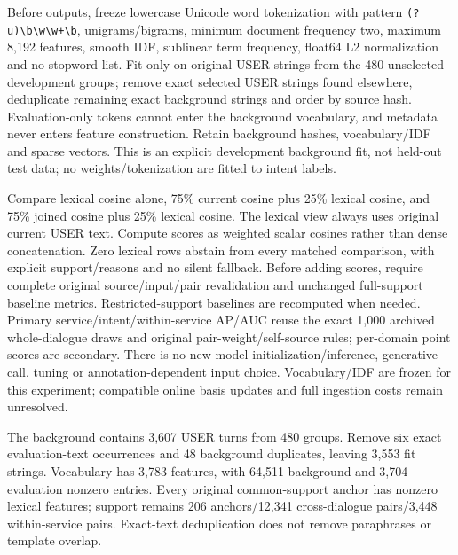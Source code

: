\documentclass[11pt]{article}
\begin{document}
Before outputs, freeze lowercase Unicode word tokenization with pattern
\verb|(?u)\b\w\w+\b|, unigrams/bigrams, minimum document frequency two,
maximum 8,192 features, smooth IDF, sublinear term frequency, float64 L2
normalization and no stopword list. Fit only on original USER strings from the
480 unselected development groups; remove exact selected USER strings found
elsewhere, deduplicate remaining exact background strings and order by source
hash. Evaluation-only tokens cannot enter the background vocabulary, and metadata
never enters feature construction. Retain background hashes, vocabulary/IDF and
sparse vectors. This is an explicit development background fit, not held-out test
data; no weights/tokenization are fitted to intent labels.

Compare lexical cosine alone, 75\% current cosine plus 25\% lexical cosine, and
75\% joined cosine plus 25\% lexical cosine. The lexical view always uses original
current USER text. Compute scores as weighted scalar cosines rather than dense
concatenation. Zero lexical rows abstain from every matched comparison, with
explicit support/reasons and no silent fallback. Before adding scores, require
complete original source/input/pair revalidation and unchanged full-support
baseline metrics. Restricted-support baselines are recomputed when needed.
Primary service/intent/within-service AP/AUC reuse the exact 1,000 archived
whole-dialogue draws and original pair-weight/self-source rules; per-domain point
scores are secondary. There is no new model initialization/inference, generative
call, tuning or annotation-dependent input choice. Vocabulary/IDF are frozen for
this experiment; compatible online basis updates and full ingestion costs remain
unresolved.

The background contains 3,607 USER turns from 480 groups. Remove six exact
evaluation-text occurrences and 48 background duplicates, leaving 3,553 fit
strings. Vocabulary has 3,783 features, with 64,511 background and 3,704 evaluation
nonzero entries. Every original common-support anchor has nonzero lexical features;
support remains 206 anchors/12,341 cross-dialogue pairs/3,448 within-service pairs.
Exact-text deduplication does not remove paraphrases or template overlap.
\end{document}
